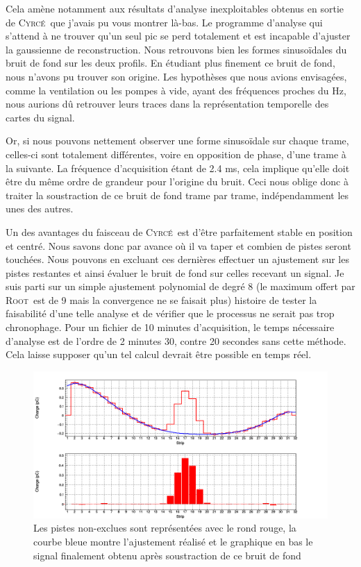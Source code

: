 \documentclass[a4paper,11pt]{article}
\newcommand{\cyrce}{\textsc{Cyrcé}}
\newcommand{\Root}{\textsc{Root}}
\begin{document}
Cela amène notamment aux résultats d’analyse inexploitables obtenus en sortie de \cyrce\ que j’avais pu vous montrer là-bas.
Le programme d’analyse qui s’attend à ne trouver qu’un seul pic se perd totalement et est incapable d’ajuster la gaussienne de reconstruction. 
Nous retrouvons bien les formes sinusoïdales du bruit de fond sur les deux profils.
En étudiant plus finement ce bruit de fond, nous n’avons pu trouver son origine. 
Les hypothèses que nous avions envisagées, comme la ventilation ou les pompes à vide, ayant des fréquences proches du Hz, nous aurions dû retrouver leurs traces dans la représentation temporelle des cartes du signal.

Or, si nous pouvons nettement observer une forme sinusoïdale sur chaque trame, celles-ci sont totalement différentes, voire en opposition de phase, d’une trame à la suivante. 
La fréquence d’acquisition étant de 2.4 ms, cela implique qu’elle doit être du même ordre de grandeur pour l’origine du bruit. 
Ceci nous oblige donc à traiter la soustraction de ce bruit de fond trame par trame, indépendamment les unes des autres.

Un des avantages du faisceau de \cyrce\ est d’être parfaitement stable en position et centré. 
Nous savons donc par avance où il va taper et combien de pistes seront touchées. 
Nous pouvons en excluant ces dernières effectuer un ajustement sur les pistes restantes et ainsi évaluer le bruit de fond sur celles recevant un signal. 
Je suis parti sur un simple ajustement polynomial de degré 8 (le maximum offert par \Root\ est de 9 mais la convergence ne se faisait plus) histoire de tester la faisabilité d’une telle analyse et de vérifier que le processus ne serait pas trop chronophage. 
Pour un fichier de 10 minutes d’acquisition, le temps nécessaire d’analyse est de l’ordre de 2 minutes 30, contre 20 secondes sans cette méthode. 
Cela laisse supposer qu’un tel calcul devrait être possible en temps réel.
\begin{figure}[h]
\begin{center}
\includegraphics[scale=0.4]{SFB_396.png} 
\caption{\label{fig:396}\footnotesize{Les pistes non-exclues sont représentées avec le rond rouge, la courbe bleue montre l’ajustement réalisé et le graphique en bas le signal finalement obtenu après soustraction de ce bruit de fond}}
\end{center}
\end{figure}
\end{document}
